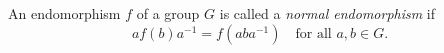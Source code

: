 An endomorphism $f$ of a group $G$ is called a \emph{normal endomorphism} if
$$af(b)a^{-1} = f(aba^{-1}) \quad \text{for all } a, b \in G.$$
